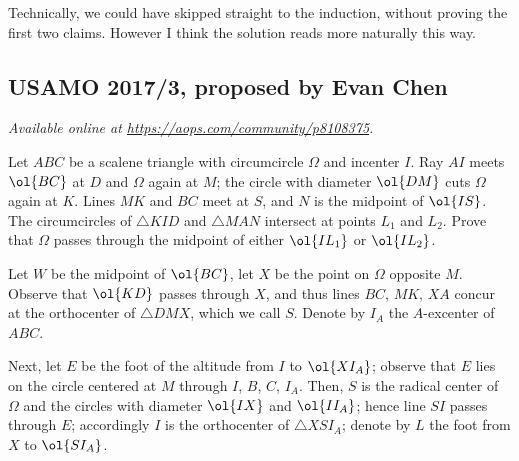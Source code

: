 \documentclass[11pt]{scrartcl}
\begin{document}
\begin{remark*}
  Technically, we could have skipped straight to the induction,
  without proving the first two claims.
  However I think the solution reads more naturally this way.
\end{remark*}
\pagebreak

\subsection{USAMO 2017/3, proposed by Evan Chen}
\textsl{Available online at \url{https://aops.com/community/p8108375}.}
\begin{mdframed}[style=mdpurplebox,frametitle={Problem statement}]
Let $ABC$ be a scalene triangle with circumcircle $\Omega$ and incenter $I$.
Ray $AI$ meets $\ol{BC}$ at $D$ and $\Omega$ again at $M$;
the circle with diameter $\ol{DM}$ cuts $\Omega$ again at $K$.
Lines $MK$ and $BC$ meet at $S$, and $N$ is the midpoint of $\ol{IS}$.
The circumcircles of $\triangle KID$ and $\triangle MAN$
intersect at points $L_1$ and $L_2$.
Prove that $\Omega$ passes through the midpoint of either $\ol{IL_1}$ or $\ol{IL_2}$.
\end{mdframed}
Let $W$ be the midpoint of $\ol{BC}$,
let $X$ be the point on $\Omega$ opposite $M$.
Observe that $\ol{KD}$ passes through $X$,
and thus lines $BC$, $MK$, $XA$ concur at
the orthocenter of $\triangle DMX$, which we call $S$.
Denote by $I_A$ the $A$-excenter of $ABC$.

Next, let $E$ be the foot of the altitude from $I$ to $\ol{XI_A}$;
observe that $E$ lies on the circle centered at $M$
through $I$, $B$, $C$, $I_A$.
Then, $S$ is the radical center of $\Omega$
and the circles with diameter $\ol{IX}$ and $\ol{II_A}$;
hence line $SI$ passes through $E$;
accordingly $I$ is the orthocenter of $\triangle XSI_A$;
denote by $L$ the foot from $X$ to $\ol{SI_A}$.
\end{document}
